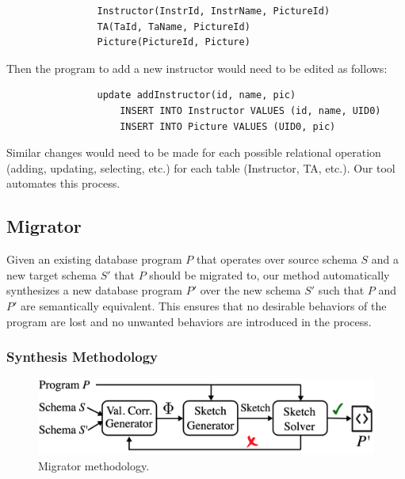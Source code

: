 \documentclass[]{article}
\begin{document}
            \begin{verbatim}
                Instructor(InstrId, InstrName, PictureId)
                TA(TaId, TaName, PictureId) 
                Picture(PictureId, Picture) 
            \end{verbatim}

            Then the program to add a new instructor would need to be edited as follows:
            
            \begin{verbatim}
                update addInstructor(id, name, pic) 
                    INSERT INTO Instructor VALUES (id, name, UID0)
                    INSERT INTO Picture VALUES (UID0, pic)
            \end{verbatim}

            Similar changes would need to be made for each possible relational operation (adding, updating, selecting, etc.) for each table (Instructor, TA, etc.). Our tool automates this process. 


        \subsection{Migrator}


            Given an existing database program $P$ that operates over source schema $S$ and a new target schema $S'$ that $P$ should be migrated to, our method automatically synthesizes a new database program $P'$ over the new schema $S'$ such that $P$ and $P'$ are semantically equivalent. This ensures that no desirable behaviors of the program are lost and no unwanted behaviors are introduced in the process.



            \subsubsection{Synthesis Methodology}

                \begin{figure}[]
                    \centering
                    \includegraphics[width=.7\textwidth]{migrator_methodology}
                    \caption{Migrator methodology.}
                    \label{fig:migrator_methodology}
                \end{figure}
\end{document}
